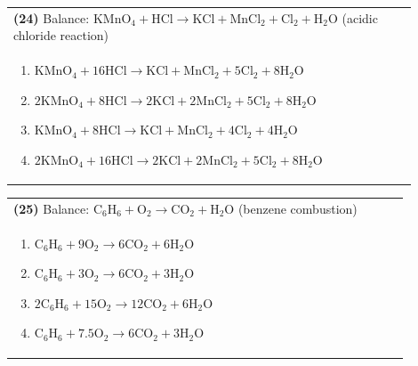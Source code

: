 \documentclass{article}
\begin{document}
\vspace{0.2cm}
\noindent \begin{tabular}{|p{0.9\linewidth}|}
\hline
\vspace{0.2cm}
\textbf{(24)} Balance: \(\mathrm{KMnO_4 + HCl \rightarrow KCl + MnCl_2 + Cl_2 + H_2O}\) (acidic chloride reaction)\\
\begin{minipage}[t]{0.85\linewidth}
\begin{enumerate}[label=\alph*.]
   \item \(\mathrm{KMnO_4 + 16HCl \rightarrow KCl + MnCl_2 + 5Cl_2 + 8H_2O}\)
   \item \(\mathrm{2KMnO_4 + 8HCl \rightarrow 2KCl + 2MnCl_2 + 5Cl_2 + 8H_2O}\)
   \item \(\mathrm{KMnO_4 + 8HCl \rightarrow KCl + MnCl_2 + 4Cl_2 + 4H_2O}\)
   \item \(\mathrm{2KMnO_4 + 16HCl \rightarrow 2KCl + 2MnCl_2 + 5Cl_2 + 8H_2O}\)
\end{enumerate}
\end{minipage}\\
\hline
\end{tabular}
\newpage

\vspace{0.2cm}
\noindent \begin{tabular}{|p{0.9\linewidth}|}
\hline
\vspace{0.2cm}
\textbf{(25)} Balance: \(\mathrm{C_6H_6 + O_2 \rightarrow CO_2 + H_2O}\) (benzene combustion)\\
\begin{minipage}[t]{0.85\linewidth}
\begin{enumerate}[label=\alph*.]
   \item \(\mathrm{C_6H_6 + 9O_2 \rightarrow 6CO_2 + 6H_2O}\)
   \item \(\mathrm{C_6H_6 + 3O_2 \rightarrow 6CO_2 + 3H_2O}\)
   \item \(\mathrm{2C_6H_6 + 15O_2 \rightarrow 12CO_2 + 6H_2O}\)
   \item \(\mathrm{C_6H_6 + 7.5O_2 \rightarrow 6CO_2 + 3H_2O}\)
\end{enumerate}
\end{minipage}\\
\hline
\end{tabular}
\end{document}
